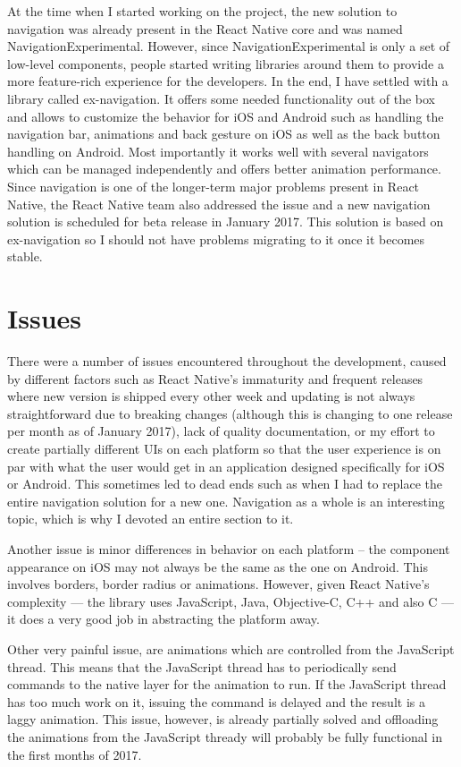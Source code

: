 At the time when I started working on the project, the new solution to navigation was already present in the React Native core and was named NavigationExperimental. However, since NavigationExperimental is only a set of low-level components, people started writing libraries around them to provide a more feature-rich experience for the developers. In the end, I have settled with a library called ex-navigation. It offers some needed functionality out of the box and allows to customize the behavior for iOS and Android such as handling the navigation bar, animations and back gesture on iOS as well as the back button handling on Android. Most importantly it works well with several navigators which can be managed independently and offers better animation performance. Since navigation is one of the longer-term major problems present in React Native, the React Native team also addressed the issue and a new navigation solution is scheduled for beta release in January 2017. This solution is based on ex-navigation so I should not have problems migrating to it once it becomes stable.

\section{Issues}

There were a number of issues encountered throughout the development, caused by different factors such as React Native's immaturity and frequent releases where new version is shipped every other week and updating is not always straightforward due to breaking changes (although this is changing to one release per month as of January 2017), lack of quality documentation, or my effort to create partially different UIs on each platform so that the user experience is on par with what the user would get in an application designed specifically for iOS or Android. This sometimes led to dead ends such as when I had to replace the entire navigation solution for a new one. Navigation as a whole is an interesting topic, which is why I devoted an entire section to it.


Another issue is minor differences in behavior on each platform -- the component appearance on iOS may not always be the same as the one on Android. This involves borders, border radius or animations. However, given React Native's complexity --- the library uses JavaScript, Java, Objective-C, C++ and also C --- it does a very good job in abstracting the platform away.


Other very painful issue, are animations which are controlled from the JavaScript thread. This means that the JavaScript thread has to periodically send commands to the native layer for the animation to run. If the JavaScript thread has too much work on it, issuing the command is delayed and the result is a laggy animation. This issue, however, is already partially solved and offloading the animations from the JavaScript thready will probably be fully functional in the first months of 2017.

